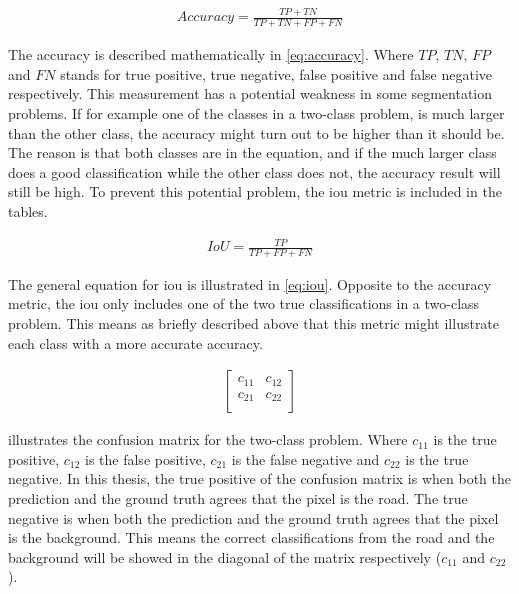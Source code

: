 \documentclass[USenglish]{ifimaster}  %
\begin{document}
\begin{equation}\label{eq:accuracy}
\begin{aligned}
Accuracy = \frac{TP + TN}{TP + TN + FP + FN}
\end{aligned}
\end{equation}

The accuracy is described mathematically in \cref{eq:accuracy}. Where $TP$, $TN$, $FP$ and $FN$ stands for true positive, true negative, false positive and false negative respectively. This measurement has a potential weakness in some segmentation problems. If for example one of the classes in a two-class problem, is much larger than the other class, the accuracy might turn out to be higher than it should be. The reason is that both classes are in the equation, and if the much larger class does a good classification while the other class does not, the accuracy result will still be high. To prevent this potential problem, the \ac{iou} metric is included in the tables. 

\begin{equation}\label{eq:iou}
\begin{aligned}
IoU = \frac{TP}{TP + FP + FN}
\end{aligned}
\end{equation}

The general equation for \ac{iou} is illustrated in \cref{eq:iou}. Opposite to the accuracy metric, the \ac{iou} only includes one of the two true classifications in a two-class problem. This means as briefly described above that this metric might illustrate each class with a more accurate accuracy.

\begin{equation}\label{eq:confusion_matrix}
\begin{aligned}
\begin{bmatrix} 
   c_{11} & c_{12} \\
   c_{21} & c_{22} \\
\end{bmatrix} 
\end{aligned}
\end{equation}

 illustrates the confusion matrix for the two-class problem. Where $c_{11}$ is the true positive, $c_{12}$ is the false positive, $c_{21}$ is the false negative and $c_{22}$ is the true negative. In this thesis, the true positive of the confusion matrix is when both the prediction and the ground truth agrees that the pixel is the road. The true negative is when both the prediction and the ground truth agrees that the pixel is the background. This means the correct classifications from the road and the background will be showed in the diagonal of the matrix respectively ($c_{11}$ and $c_{22}$).
\end{document}
